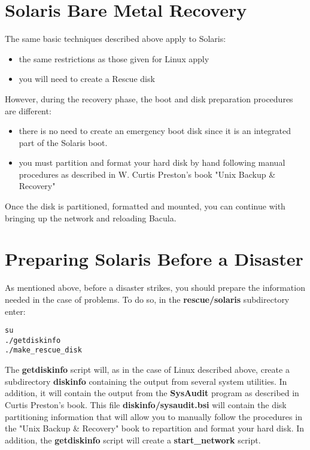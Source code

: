 \label{solaris}
\section{Solaris Bare Metal Recovery}

The same basic techniques described above apply to Solaris: 

\begin{itemize}
\item the same restrictions as those given for Linux apply  
\item you will need to create a Rescue disk 
   \end{itemize}

However, during the recovery phase, the boot and disk preparation procedures
are different: 

\begin{itemize}
\item there is no need to create an emergency boot disk  since it is an
   integrated part of the Solaris boot.  
\item you must partition and format your hard disk by hand  following manual
   procedures as described in W. Curtis Preston's  book "Unix Backup \&
   Recovery" 
\end{itemize}

Once the disk is partitioned, formatted and mounted, you can continue with
bringing up the network and reloading Bacula. 

\section{Preparing Solaris Before a Disaster}

As mentioned above, before a disaster strikes, you should prepare the
information needed in the case of problems. To do so, in the {\bf
rescue/solaris} subdirectory enter: 

\footnotesize
\begin{verbatim}
su
./getdiskinfo
./make_rescue_disk
\end{verbatim}
\normalsize

The {\bf getdiskinfo} script will, as in the case of Linux described above,
create a subdirectory {\bf diskinfo} containing the output from several system
utilities. In addition, it will contain the output from the {\bf SysAudit}
program as described in Curtis Preston's book. This file {\bf
diskinfo/sysaudit.bsi} will contain the disk partitioning information that
will allow you to manually follow the procedures in the "Unix Backup \&
Recovery" book to repartition and format your hard disk. In addition, the
{\bf getdiskinfo} script will create a {\bf start\_network} script. 

